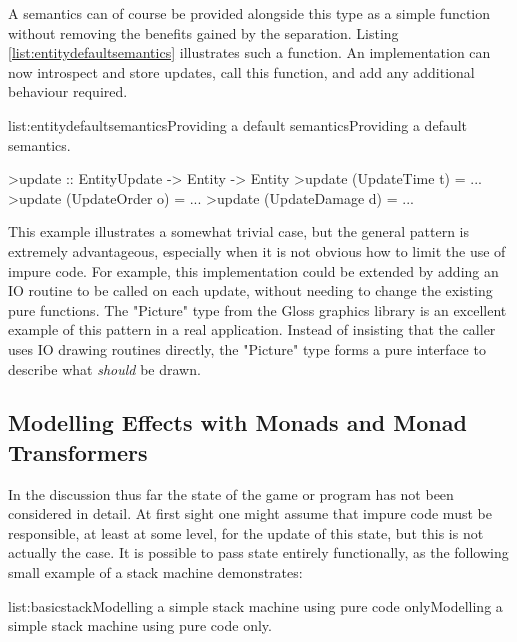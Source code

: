 A semantics can of course be provided alongside this type as a simple function without removing the benefits gained by the separation. Listing \ref{list:entitydefaultsemantics} illustrates such a function. An implementation can now introspect and store updates, call this function, and add any additional behaviour required.

\vspace{-0.5em}
\begin{listing}{list:entitydefaultsemantics}{Providing a default semantics}{Providing a default semantics.}{}
\end{listing}\vspace{-1.5em}

\begin{haskell}

>update :: EntityUpdate -> Entity -> Entity
>update (UpdateTime t) = ...
>update (UpdateOrder o) = ...
>update (UpdateDamage d) = ...

\end{haskell}
\noindent This example illustrates a somewhat trivial case, but the general pattern is extremely advantageous, especially when it is not obvious how to limit the use of impure code. For example, this implementation could be extended by adding an IO routine to be called on each update, without needing to change the existing pure functions. 
The "Picture" type from the Gloss graphics library is an excellent example of this pattern in a real application. Instead of insisting that the caller uses IO drawing routines directly, the "Picture" type forms a pure interface to describe what \emph{should} be drawn.

\subsection[Modelling Effects with Monads and Monad Transformers]{Modelling Effects with Monads and Monad \\Transformers}

In the discussion thus far the state of the game or program has not been considered in detail. At first sight one might assume that impure code must be responsible, at least at some level, for the update of this state, but this is not actually the case. It is possible to pass state entirely functionally, as the following small example of a stack machine demonstrates:

\vspace{-0.5em}
\begin{listing}{list:basicstack}{Modelling a simple stack machine using pure code only}{Modelling a simple stack machine using pure code only.}{}
\end{listing}\vspace{-1.5em}


